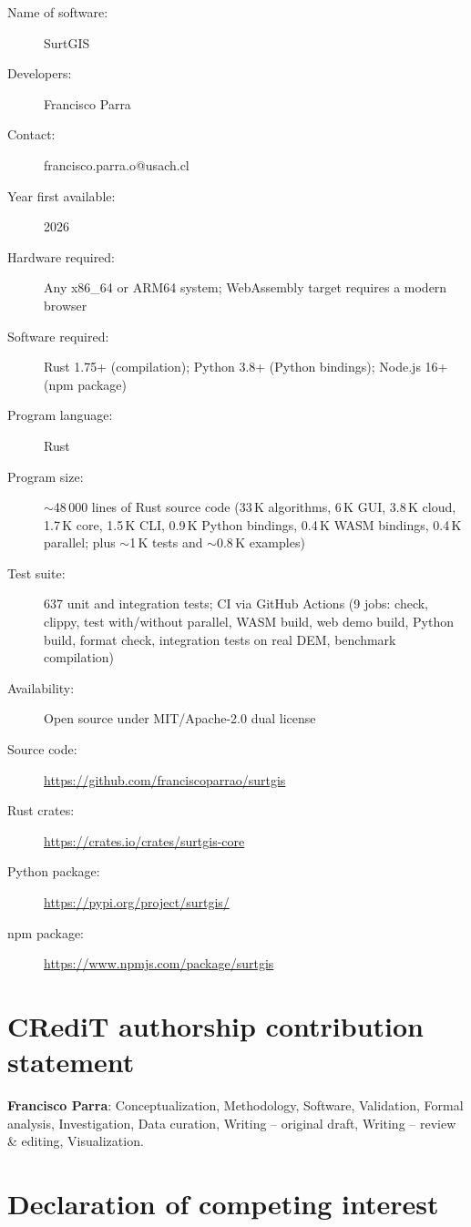 \documentclass[preprint,review,12pt,authoryear]{elsarticle}
\begin{document}
\begin{description}
    \item[Name of software:] SurtGIS
    \item[Developers:] Francisco Parra
    \item[Contact:] francisco.parra.o@usach.cl
    \item[Year first available:] 2026
    \item[Hardware required:] Any x86\_64 or ARM64 system; WebAssembly target requires a modern browser
    \item[Software required:] Rust 1.75+ (compilation); Python 3.8+ (Python bindings); Node.js 16+ (npm package)
    \item[Program language:] Rust
    \item[Program size:] $\sim$48\,000 lines of Rust source code (33\,K algorithms, 6\,K GUI, 3.8\,K cloud, 1.7\,K core, 1.5\,K CLI, 0.9\,K Python bindings, 0.4\,K WASM bindings, 0.4\,K parallel; plus $\sim$1\,K tests and $\sim$0.8\,K examples)
    \item[Test suite:] 637 unit and integration tests; CI via GitHub Actions (9 jobs: check, clippy, test with/without parallel, WASM build, web demo build, Python build, format check, integration tests on real DEM, benchmark compilation)
    \item[Availability:] Open source under MIT/Apache-2.0 dual license
    \item[Source code:] \url{https://github.com/franciscoparrao/surtgis}
    \item[Rust crates:] \url{https://crates.io/crates/surtgis-core}
    \item[Python package:] \url{https://pypi.org/project/surtgis/}
    \item[npm package:] \url{https://www.npmjs.com/package/surtgis}
\end{description}

\section*{CRediT authorship contribution statement}

\textbf{Francisco Parra}: Conceptualization, Methodology, Software, Validation, Formal analysis, Investigation, Data curation, Writing -- original draft, Writing -- review \& editing, Visualization.

\section*{Declaration of competing interest}
\end{document}
